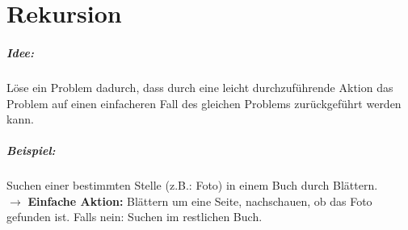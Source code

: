 \chapter{Rekursion}
\paragraph{Idee:} Löse ein Problem dadurch, dass durch eine leicht durchzuführende Aktion das Problem auf einen einfacheren Fall des gleichen Problems zurückgeführt werden kann.

\paragraph{Beispiel:} Suchen einer bestimmten Stelle (z.B.: Foto) in einem Buch durch Blättern.\\
$\rightarrow$ {\bf Einfache Aktion:} Blättern um eine Seite, nachschauen, ob das Foto gefunden ist. Falls nein: Suchen im restlichen Buch.

